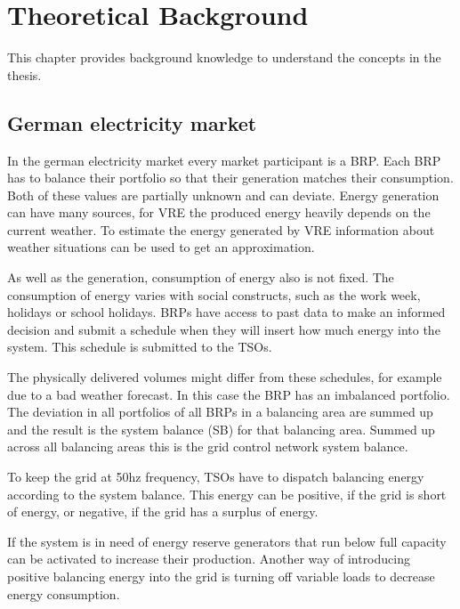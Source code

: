 \documentclass[class=scrbook, crop=false]{standalone}
\begin{document}


\chapter{Theoretical Background}
\label{Chapter::Theoretical_Background} %
This chapter provides background knowledge to understand the concepts in the thesis.

\section{German electricity market}
\label{Section::German_Electricity_Market}

In the german electricity market every market participant is a BRP. Each BRP has to balance their portfolio so that their generation matches their consumption. Both of these values are partially unknown and can deviate. 
Energy generation can have many sources, for VRE the produced energy heavily depends on the current weather.
To estimate the energy generated by VRE information about weather situations can be used to get an approximation. 

As well as the generation, consumption of energy also is not fixed. The consumption of energy varies with social constructs, such as the work week, holidays or school holidays. 
BRPs have access to past data to make an informed decision and submit a schedule when they will insert how much energy into the system.
This schedule is submitted to the TSOs.

The physically delivered volumes might differ from these schedules, for example due to a bad weather forecast. In this case the BRP has an imbalanced portfolio.
The deviation in all portfolios of all BRPs in a balancing area are summed up and the result is the system balance (SB) for that balancing area. Summed up across all balancing areas this is the grid control network system balance.

To keep the grid at 50hz frequency, TSOs have to dispatch balancing energy according to the system balance. This energy can be positive, if the grid is short of energy, or negative, if the grid has a surplus of energy. 

If the system is in need of energy reserve generators that run below full capacity can be activated to increase their production. Another way of introducing positive balancing energy into the grid is turning off variable loads to decrease energy consumption.
\end{document}
